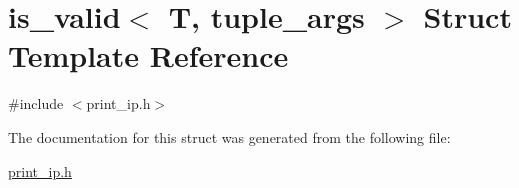 \hypertarget{structis__valid}{}\section{is\+\_\+valid$<$ T, tuple\+\_\+args $>$ Struct Template Reference}
\label{structis__valid}


{\ttfamily \#include $<$print\+\_\+ip.\+h$>$}



The documentation for this struct was generated from the following file\+:\begin{DoxyCompactItemize}
\item 
\hyperlink{print__ip_8h}{print\+\_\+ip.\+h}\end{DoxyCompactItemize}
